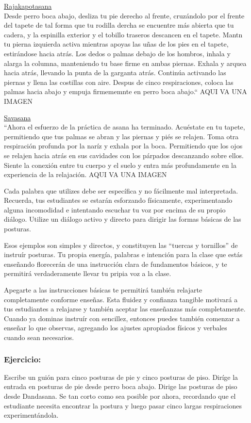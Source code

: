 \underline{Rajakapotasana}\\
Desde perro boca abajo, desliza tu pie derecho al frente, cruzándolo por el frente del tapete de tal forma que tu rodilla dercha se encuentre más abierta que tu cadera, y la espinilla exterior y el tobillo traseros descancen en el tapete. Mantn tu pierna izquierda activa mientras apoyas las uñas de los pies en el tapete, estirándose hacia atrás. Los dedos o palmas debajo de los hombros, inhala y alarga la columna, manteniendo tu base firme en ambas piernas. Exhala y arquea hacia atrás, llevando la punta de la garganta atrás. Continúa activando las piernas y llena las costillas con aire. Despus de cinco respiraciones, coloca las palmas hacia abajo y empuja firmememnte en perro boca abajo.``
AQUI VA UNA IMAGEN

\underline{Savasana}\\
``Ahora el esfuerzo de la práctica de asana ha terminado. Acu\'estate en tu tapete, permitiendo que tus palmas se abran y las piernas y pi\'es se relajen. Toma otra respiración profunda por la naríz y exhala por la boca. Permitiendo que los ojos se relajen hacia atrás en sus cavidades con los párpados descanzando sobre ellos. Siente la conexión entre tu cuerpo y el suelo y entra más profundamente en la experiencia de la relajación.
AQUI VA UNA IMAGEN

Cada palabra que utilizes debe ser específica y no fácilmente mal interpretada. Recuerda, tus estudiantes se estarán esforzando físicamente, experimentando alguna incomodidad e intentando escuchar tu voz por encima de su propio diálogo. Utilize un diálogo activo y directo para dirigir las formas básicas de las posturas.

Esos ejemplos son simples y directos, y constituyen las ``tuercas y tornillos'' de instruír posturas. Tu propia energía, palabras e intención para la clase que estás enseñando florecerán de una instrucción clara de fundamentos básicos, y te permitirá verdaderamente llevar tu pripia voz a la clase.

Apegarte a las instrucciones básicas te permitirá tambi\'en relajarte completamente conforme enseñas. Esta fluidez y confianza tangible motivará a tus estudiantes a relajarse y tambi\'en aceptar las enseñanzas más completamente. Cuando ya dominas instruír con sencillez, entonces puedes tambi\'en comenzar a enseñar lo que observas, agregando los ajustes apropiados físicos y verbales cuando sean necesarios.

\subsubsection{Ejercicio:}
Escribe un guión para cinco posturas de pie y cinco posturas de piso. Diríge la entrada en posturas de pie desde perro boca abajo. Dirige las posturas de piso desde Dandasana. Se tan corto como sea posible por ahora, recordando que el estudiante necesita encontrar la postura y luego pasar cinco largas respiraciones experimentándola.

